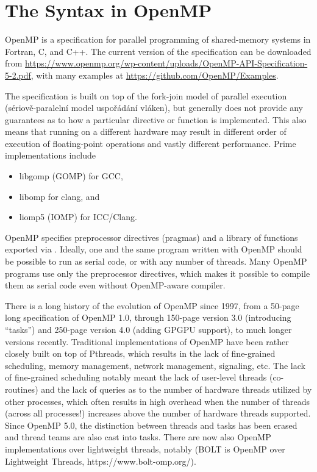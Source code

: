 \chapter{The Syntax in OpenMP}

OpenMP is a specification for parallel programming of shared-memory systems in Fortran, C, and C++. 
The current version of the specification can be downloaded from \url{https://www.openmp.org/wp-content/uploads/OpenMP-API-Specification-5-2.pdf}, with many examples at \url{https://github.com/OpenMP/Examples}.

The specification is built on top of the fork-join model of parallel execution (sériově-paralelní model uspořádání vláken),
but generally does not provide any guarantees as to how a particular directive or function is implemented. 
This also means that running on a different hardware may result in different order of execution of floating-point operations and vastly different performance.  
Prime implementations include 
\begin{itemize}
\item libgomp (GOMP) for GCC, 
\item libomp for clang, and 
\item liomp5 (IOMP) for ICC/Clang.
\end{itemize} 

OpenMP specifies preprocessor directives (pragmas) and a library of functions exported via .
Ideally, one and the same program written with OpenMP should be possible to run as serial code, or with any number of threads. 
Many OpenMP programs use only the preprocessor directives, which makes it possible to compile them as serial code even without OpenMP-aware compiler. 

There is a long history of the evolution of OpenMP since 1997, from a 50-page long specification of OpenMP 1.0, through 150-page version 3.0 (introducing ``tasks'') and 250-page version 4.0 (adding GPGPU support), to much longer versions recently. 
Traditional implementations of OpenMP have been rather closely built on top of Pthreads, 
which results in the lack of fine-grained scheduling, 
memory management, network management, signaling, etc.
The lack of fine-grained scheduling notably meant the lack of user-level threads (co-routines)
and the lack of queries as to the number of hardware threads utilized by other processes, 
which often results in high overhead when the number of threads (across all processes!) increases above the number of hardware threads supported.
Since OpenMP 5.0, the distinction between threads and tasks has been erased and thread teams are also cast into tasks. There are now also OpenMP implementations over lightweight threads, notably (BOLT is OpenMP over Lightweight Threads, https://www.bolt-omp.org/). 

